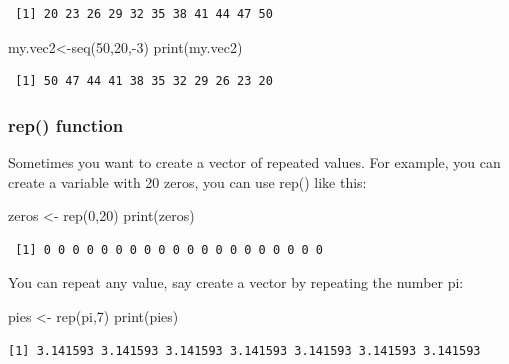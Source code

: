 \documentclass[
  letterpaper,
  DIV=11,
  numbers=noendperiod]{scrreprt}
\newenvironment{Shaded}{\begin{snugshade}}{\end{snugshade}}
\newcommand{\DecValTok}[1]{\textcolor[rgb]{0.68,0.00,0.00}{#1}}
\newcommand{\FunctionTok}[1]{\textcolor[rgb]{0.28,0.35,0.67}{#1}}
\newcommand{\NormalTok}[1]{\textcolor[rgb]{0.00,0.23,0.31}{#1}}
\newcommand{\OtherTok}[1]{\textcolor[rgb]{0.00,0.23,0.31}{#1}}
\newcommand{\SpecialCharTok}[1]{\textcolor[rgb]{0.37,0.37,0.37}{#1}}
\begin{document}
\begin{verbatim}
 [1] 20 23 26 29 32 35 38 41 44 47 50
\end{verbatim}

\begin{Shaded}
\begin{Highlighting}[]
\NormalTok{my.vec2}\OtherTok{\textless{}{-}}\FunctionTok{seq}\NormalTok{(}\DecValTok{50}\NormalTok{,}\DecValTok{20}\NormalTok{,}\SpecialCharTok{{-}}\DecValTok{3}\NormalTok{)}
\FunctionTok{print}\NormalTok{(my.vec2)}
\end{Highlighting}
\end{Shaded}

\begin{verbatim}
 [1] 50 47 44 41 38 35 32 29 26 23 20
\end{verbatim}

\hypertarget{rep-function}{%
\subsubsection{rep() function}\label{rep-function}}

Sometimes you want to create a vector of repeated values. For example,
you can create a variable with 20 zeros, you can use rep() like this:

\begin{Shaded}
\begin{Highlighting}[]
\NormalTok{zeros }\OtherTok{\textless{}{-}} \FunctionTok{rep}\NormalTok{(}\DecValTok{0}\NormalTok{,}\DecValTok{20}\NormalTok{)}
\FunctionTok{print}\NormalTok{(zeros)}
\end{Highlighting}
\end{Shaded}

\begin{verbatim}
 [1] 0 0 0 0 0 0 0 0 0 0 0 0 0 0 0 0 0 0 0 0
\end{verbatim}

You can repeat any value, say create a vector by repeating the number
pi:

\begin{Shaded}
\begin{Highlighting}[]
\NormalTok{pies }\OtherTok{\textless{}{-}} \FunctionTok{rep}\NormalTok{(pi,}\DecValTok{7}\NormalTok{)}
\FunctionTok{print}\NormalTok{(pies)}
\end{Highlighting}
\end{Shaded}

\begin{verbatim}
[1] 3.141593 3.141593 3.141593 3.141593 3.141593 3.141593 3.141593
\end{verbatim}
\end{document}

